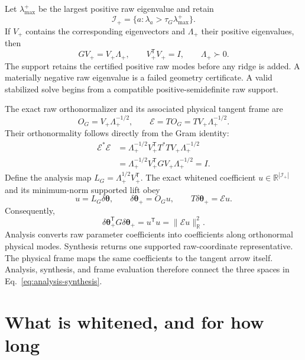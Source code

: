 \documentclass[10pt,twocolumn]{article}
\begin{document}
Let \(\lambda_{\max}^+\) be the largest positive raw eigenvalue and retain
\begin{equation}
\mathcal I_+=\{a:\lambda_a>\tau_G\lambda_{\max}^+\}.
\label{eq:support-test}
\end{equation}
If \(V_+\) contains the corresponding eigenvectors and \(\Lambda_+\) their
positive eigenvalues, then
\begin{equation}
GV_+=V_+\Lambda_+,\qquad
V_+^{\mathsf T}V_+=I,\qquad
\Lambda_+\succ0.
\label{eq:supported-spectrum}
\end{equation}
The support retains the certified positive raw modes before any ridge is added.
A materially negative raw eigenvalue is a failed geometry certificate. A valid
stabilized solve begins from a compatible positive-semidefinite raw support.

The exact raw orthonormalizer and its associated physical tangent frame are
\begin{equation}
O_G=V_+\Lambda_+^{-1/2},
\qquad
\mathcal E=TO_G=TV_+\Lambda_+^{-1/2}.
\label{eq:exact-frame}
\end{equation}
Their orthonormality follows directly from the Gram identity:
\begin{align}
\mathcal E^*\mathcal E
&=\Lambda_+^{-1/2}V_+^{\mathsf T}T^*TV_+
\Lambda_+^{-1/2}\nonumber\\
&=\Lambda_+^{-1/2}V_+^{\mathsf T}GV_+
\Lambda_+^{-1/2}=I.
\label{eq:exact-frame-proof}
\end{align}
Define the analysis map
\(L_G=\Lambda_+^{1/2}V_+^{\mathsf T}\). The exact whitened coefficient
\(u\in\mathbb R^{|\mathcal I_+|}\) and its minimum-norm supported lift obey
\begin{equation}
u=L_G\delta\bm\theta,\qquad
\delta\bm\theta_+=O_Gu,\qquad
T\delta\bm\theta_+=\mathcal Eu.
\label{eq:analysis-synthesis}
\end{equation}
Consequently,
\begin{equation}
\delta\bm\theta_+^{\mathsf T}G\delta\bm\theta_+
=u^{\mathsf T}u
=\|\mathcal Eu\|_{\mathbb R}^2.
\label{eq:exact-whitened-length}
\end{equation}
Analysis converts raw parameter coefficients into coefficients along
orthonormal physical modes. Synthesis returns one supported raw-coordinate
representative. The physical frame maps the same coefficients to the tangent
arrow itself. Analysis, synthesis, and frame evaluation therefore connect the
three spaces in Eq.~\eqref{eq:analysis-synthesis}.

\section*{What is whitened, and for how long}
\end{document}
